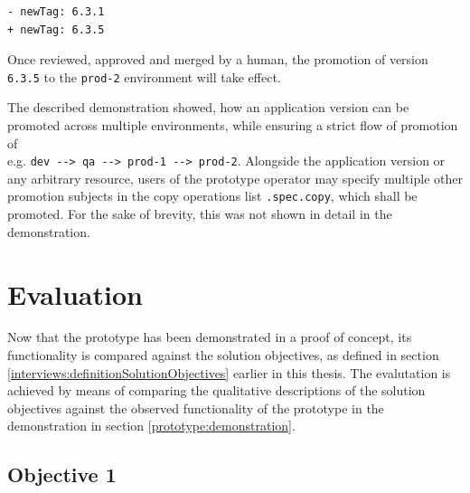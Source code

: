 \begin{lstlisting}
- newTag: 6.3.1
+ newTag: 6.3.5
\end{lstlisting}

Once reviewed, approved and merged by a human,
the promotion of version \lstinline|6.3.5| to the \lstinline|prod-2| environment
will take effect.

The described demonstration showed,
how an application version can be promoted across multiple environments,
while ensuring a strict flow of promotion of \\
e.g. \lstinline|dev --> qa --> prod-1 --> prod-2|.
Alongside the application version or any arbitrary resource,
users of the prototype operator may specify multiple other
promotion subjects in the copy operations list \lstinline|.spec.copy|, which shall be promoted.
For the sake of brevity, this was not shown in detail in the demonstration.



























\section{Evaluation}
\label{prototype:evaluation}

Now that the prototype has been demonstrated in a proof of concept,
its functionality is compared against the solution objectives,
as defined in section
\ref{interviews:definitionSolutionObjectives}
earlier in this thesis.
The evalutation is achieved by means of
comparing the qualitative descriptions of the solution objectives against the
observed functionality of the prototype in the demonstration in section \ref{prototype:demonstration}.

\subsection*{Objective 1}

